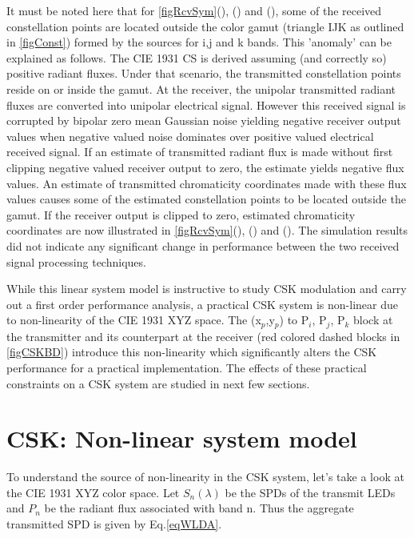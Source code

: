 \documentclass[10pt,letterpaper]{article}
\begin{document}
It must be noted here that for \figurename\ref{figRcvSym}(), () and (), some of the received constellation points are located outside the color gamut (triangle IJK as outlined in \figurename\ref{figConst}) formed by the sources for i,j and k bands. This 'anomaly' can be explained as follows. The CIE 1931 CS is derived assuming (and correctly so) positive radiant fluxes. Under that scenario, the transmitted constellation points reside on or inside the gamut. At the receiver, the unipolar transmitted radiant fluxes are converted into unipolar electrical signal. However this received signal is corrupted by bipolar zero mean Gaussian noise yielding negative receiver output values when negative valued noise dominates over positive valued electrical received signal. If an estimate of transmitted radiant flux is made without first clipping negative valued receiver output to zero, the estimate yields negative flux values. An estimate of transmitted chromaticity coordinates made with these flux values causes some of the estimated constellation points to be located outside the gamut. If the receiver output is clipped to zero, estimated chromaticity coordinates are now illustrated in \figurename\ref{figRcvSym}(), () and (). The simulation results did not indicate any significant change in performance between the two received signal processing techniques.

While this linear system model is instructive to study CSK modulation and carry out a first order performance analysis, a practical CSK system is non-linear due to non-linearity of the CIE 1931 XYZ space. The (x$_{p}$,y$_{p}$) to P$_{i}$, P$_{j}$, P$_{k}$ block at the transmitter and its counterpart at the receiver (red colored dashed blocks in \figurename\ref{figCSKBD}) introduce this non-linearity which significantly alters the CSK performance for a practical implementation. The effects of these practical constraints on a CSK system are studied in next few sections.

\section{CSK: Non-linear system model}\label{sCSKNL}

To understand the source of non-linearity in the CSK system, let's take a look at the CIE 1931 XYZ color space. Let $S_{n}(\lambda)$ be the SPDs of the transmit LEDs and $P_{n}$ be the radiant flux associated with band n. Thus the aggregate transmitted SPD is given by Eq.\eqref{eqWLDA}.
\end{document}
